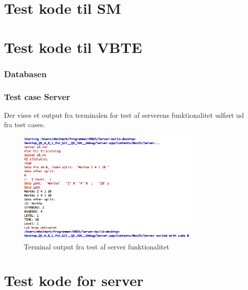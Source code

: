 \section{Test kode til SM}
\texttt{}
\section{Test kode til VBTE}

\texttt{}

\subsubsection{Databasen}
\subsubsection{Test case Server}
Der vises et output fra terminalen for test af serverens funktionalitet udført ud fra test cases.
\begin{figure}[H]
\centering
\includegraphics[width = 0.8\textwidth]{billeder/server_test}
\caption{Terminal output fra test af server funktionalitet}
\label{fig:server_test}
\end{figure}

\section{Test kode for server}
\texttt{}





